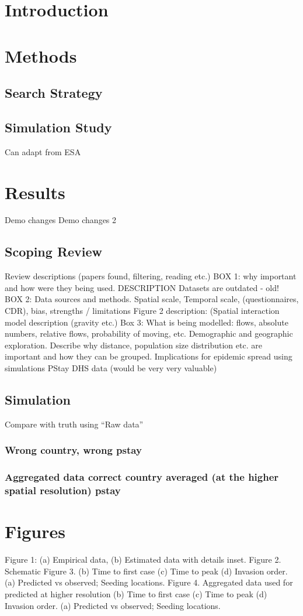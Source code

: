 \documentclass[a4paper,12pt]{article}
\begin{document}
\title{}
\author{}
\section{Introduction}
\section{Methods}
\subsection{Search Strategy}
\subsection{Simulation Study}
Can adapt from ESA
\section{Results}
Demo changes
Demo changes 2
\subsection{Scoping Review}
Review descriptions (papers found, filtering, reading etc.)
BOX 1: why important and how were they being used. DESCRIPTION
Datasets are outdated - old!
BOX 2: Data sources and methods. Spatial scale, Temporal scale, (questionnaires, CDR), bias, strengths / limitations
Figure 2 description: (Spatial interaction model description (gravity etc.)
Box 3: What is being modelled: flows, absolute numbers, relative flows, probability of moving, etc. 
Demographic and geographic exploration. Describe why distance, population size distribution etc. are important and how they can be grouped.
Implications for epidemic spread using simulations
PStay DHS data (would be very very valuable)
\subsection{Simulation}
Compare with truth using ``Raw data''
\subsubsection{Wrong country, wrong pstay}
\subsubsection{Aggregated data correct country averaged (at the higher spatial resolution) pstay}
\section{Figures}
Figure 1: (a) Empirical data, (b) Estimated data with details inset.
Figure 2. Schematic 
Figure 3. (b) Time to first case (c) Time to peak (d) Invasion order.
(a) Predicted vs observed; Seeding locations.
Figure 4. Aggregated data used for predicted at
higher resolution (b) Time to first case (c) Time to peak (d) Invasion order.
(a) Predicted vs observed; Seeding locations.
\end{document}
